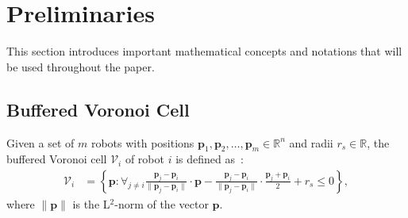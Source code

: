 \documentclass{svproc}
\newcommand{\vp}{\mathbf{p}}
\newcommand{\vf}{\mathbf{f}}
\newcommand{\vo}{\mathbf{o}}
\newcommand{\cV}{\mathcal{V}}
\newcommand{\cO}{\mathcal{O}}
\newcommand{\R}{\mathbb{R}} %
\renewcommand{\th}{^{\text{th}}}
\begin{document}



\section{Preliminaries}

This section introduces important mathematical concepts and notations that will be used throughout the paper.

\subsection{Buffered Voronoi Cell} \label{bufferedVoronoi}
Given a set of $m$ robots with positions $\vp_1,\vp_2,\ldots,\vp_m \in \R^n$ and radii $r_s \in \R$, the buffered Voronoi cell $\cV_i$ of robot $i$ is defined as~\cite{bufferedVoronoiCells}:
\begin{align}
    \cV_i &= \left\{\vp : \forall_{j\neq i} \frac{\vp_j-\vp_i}{\|\vp_j-\vp_i\|}\cdot \vp - \frac{\vp_j-\vp_i}{\|\vp_j-\vp_i\|}\cdot \frac{\vp_j+\vp_i}{2} + r_s\leq 0 \right\}, \label{voronoi_cell_definition}
\end{align}
where $\|\vp\|$ is the L$^{2}$-norm of the vector $\vp$.
\end{document}
